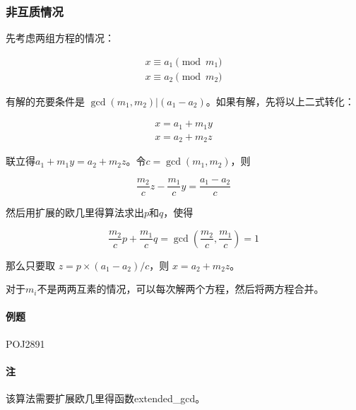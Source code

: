 

\subsubsection{非互质情况}

先考虑两组方程的情况：

\begin{equation}
  \begin{array}{l}
    x \equiv a_1 \pmod{m_1} \\
    x \equiv a_2 \pmod{m_2}				
  \end{array}
\end{equation}

有解的充要条件是 $\gcd(m_1, m_2) | (a_1-a_2)$。如果有解，先将以上二式转化：

\begin{equation}
  \begin{array}{l}
    x = a_1 + m_1 y	\\
    x = a_2 + m_2 z
  \end{array}
\end{equation}

联立得$a_1 + m_1 y = a_2 + m_2 z$。令$c=\gcd(m_1, m_2)$，则

\begin{equation}
  \frac{m_2}{c}z - \frac{m_1}{c}y = \frac{a_1-a_2}{c}
\end{equation}

然后用扩展的欧几里得算法求出$p$和$q$，使得

\begin{equation}
  \frac{m_2}{c}p + \frac{m_1}{c}q = \gcd\left(\frac{m_2}{c},\frac{m_1}{c}\right)=1
\end{equation}

那么只要取 $z=p\times(a_1-a_2)/c$，则 $x=a_2+m_2z$。

对于$m_i$不是两两互素的情况，可以每次解两个方程，然后将两方程合并。

\paragraph{例题} POJ2891

\paragraph{注} 该算法需要扩展欧几里得函数extended\_gcd。



